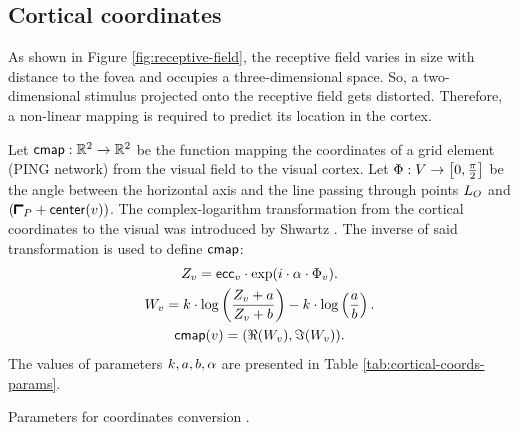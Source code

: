 \subsection{Cortical coordinates}
\label{sec:cortical-coords}

As shown in Figure \ref{fig:receptive-field}, the receptive field varies in size with distance to the fovea and occupies a three-dimensional space. So, a two-dimensional stimulus projected onto the receptive field gets distorted. Therefore, a non-linear mapping is required to predict its location in the cortex. 

Let $\mathsf{cmap}: \mathbb{R}^2 \to \mathbb{R}^2$ be the function mapping the coordinates of a grid element (PING network) from the visual field to the visual cortex.
Let $\Phi: V \to \left[ 0, \frac{\pi}{2} \right]$ be the angle between the horizontal axis and the line passing through points $L_O$ and $(\patchstart + \centr(v))$. 
The complex-logarithm transformation from the cortical coordinates to the visual was introduced by Shwartz \cite{Schwartz1980}. The inverse of said transformation is used to define $\mathsf{cmap}$:
\begin{equation}
\begin{gathered}
    Z_v = \mathsf{ecc}_v \cdot \exp(i \cdot \alpha \cdot \Phi_v). 
    \\
    W_v = k \cdot \log \left( 
        \frac{Z_v + a}{Z_v + b}
    \right) - k \cdot \log \left( 
        \frac{a}{b}
    \right).
    \\
    \mathsf{cmap}(v) = (\Re(W_v), \Im(W_v)).
\end{gathered}
\end{equation}
The values of parameters $k, a, b, \alpha$ are presented in Table \ref{tab:cortical-coords-params}.


\begin{table}[!htp]
    \centering
    
    \caption{Parameters for coordinates conversion \cite{Polimeni2005}.}
    \label{tab:cortical-coords-params}
\end{table}
